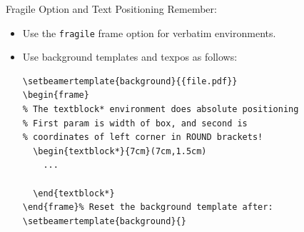 \documentclass[11pt]{slides} %
\begin{document}
\begin{frame}[fragile]{Fragile Option and Text Positioning}
    Remember:
    \begin{itemize}[<+->]
      \item Use the \texttt{fragile} frame option for \textcolor<2->{OUMidBlue}{verbatim} environments.
      \item Use \colorbox{OUYellow}{background templates} and \alert{texpos} as follows:
            \begin{verbatim}
\setbeamertemplate{background}{{file.pdf}}
\begin{frame}
% The textblock* environment does absolute positioning
% First param is width of box, and second is
% coordinates of left corner in ROUND brackets!
  \begin{textblock*}{7cm}(7cm,1.5cm)
    ...
    
  \end{textblock*}
\end{frame}% Reset the background template after:
\setbeamertemplate{background}{}
\end{verbatim}
    \end{itemize}
\end{frame}

\begin{frame}
\end{frame}
\end{document}
